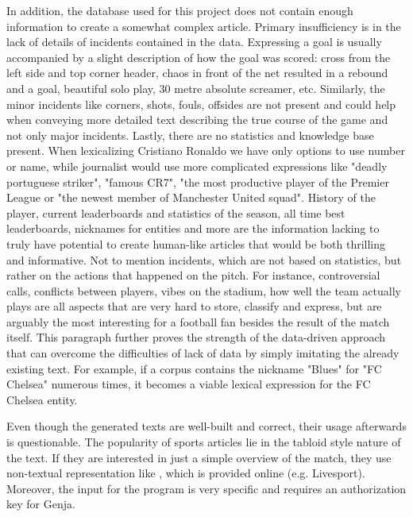 In addition, the database used for this project does not contain enough information to create a somewhat complex article. Primary insufficiency is in the lack of details of incidents contained in the data. Expressing a goal is usually accompanied by a slight description of how the goal was scored: cross from the left side and top corner header, chaos in front of the net resulted in a rebound and a goal, beautiful solo play, 30 metre absolute screamer, etc. Similarly, the minor incidents like corners, shots, fouls, offsides are not present and could help when conveying more detailed text describing the true course of the game and not only major incidents. Lastly, there are no statistics and knowledge base present. When lexicalizing Cristiano Ronaldo we have only options to use number or name, while journalist would use more complicated expressions like "deadly portuguese striker", "famous CR7", "the most productive player of the Premier League or "the newest member of Manchester United squad". History of the player, current leaderboards and statistics of the season, all time best leaderboards, nicknames for entities and more are the information lacking to truly have potential to create human-like articles that would be both thrilling and informative. Not to mention incidents, which are not based on statistics, but rather on the actions that happened on the pitch. For instance, controversial calls, conflicts between players, vibes on the stadium, how well the team actually plays are all aspects that are very hard to store, classify and express, but are arguably the most interesting for a football fan besides the result of the match itself. This paragraph further proves the strength of the data-driven approach that can overcome the difficulties of lack of data by simply imitating the already existing text. For example, if a corpus contains the nickname "Blues" for "FC Chelsea" numerous times, it becomes a viable lexical expression for the FC Chelsea entity.

Even though the generated texts are well-built and correct, their usage afterwards is questionable. The popularity of sports articles lie in the tabloid style nature of the text. If they are interested in just a simple overview of the match, they use non-textual representation like , which is provided online (e.g. Livesport). Moreover, the input for the program is very specific and requires an authorization key for Genja.

